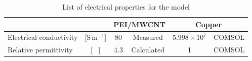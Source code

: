 \documentclass[review,times,sagev,doublespace]{sagej}
\begin{document}
\begin{sm}
\begin{table}[ht]
	\centering
	\begin{tabular}{@{}lccccc@{}}
		\toprule
		&                   & \multicolumn{2}{c}{PEI/MWCNT} & \multicolumn{2}{c}{Copper}  \\ \midrule
		Electrical conductivity & {[}S\,m$^{-1}${]} & 80         & Measured         & $5.998 \times 10^7$ & COMSOL \\
		Relative permittivity   & {[} \ {]}         & 4.3        & Calculated       & 1                  & COMSOL \\ \bottomrule
	\end{tabular}%
	\caption{List of electrical properties for the model}
	\label{tab:table_s4}
\end{table}

\FloatBarrier
	
\end{sm}
\end{document}
